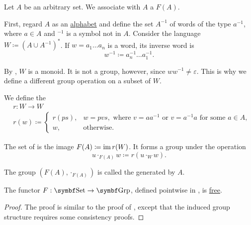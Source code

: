 \begin{definition}\label{def:free_group}
  Let \( A \) be an arbitrary set. We associate with \( A \) a  \( F(A) \).

  First, regard \( A \) as an \hyperref[def:language]{alphabet} and define the set \( A^{-1} \) of words of the type \( a^{-1} \), where \( a \in A \) and \( \mbox{}^{-1} \) is a symbol not in \( A \). Consider the language \( W \coloneqq (A \cup A^{-1})^{*} \). If \( w = a_1 \ldots a_n \) is a word, its inverse word is
  \begin{equation*}
    w^{-1} \coloneqq a_n^{-1} \ldots a_1^{-1}.
  \end{equation*}

  By , \( W \) is a monoid. It is not a group, however, since \( w w^{-1} \neq \varepsilon \). This is why we define a different group operation on a subset of \( W \).

  We define the 
  \begin{align*}
     & r: W \to W                               \\
     & r(w) \coloneqq \begin{cases}
      r(ps), & w = pvs, \text{ where } v = aa^{-1} \text{ or } v = a^{-1}a \text{ for some } a \in A, \\
      w,     & \text{otherwise}.
    \end{cases}
  \end{align*}

  The set of  is the image \( F(A) \coloneqq \operatorname{im} r(W) \). It forms a group under the operation
  \begin{equation*}
    u \cdot_{F(A)} w \coloneqq r(u \cdot_{W} w).
  \end{equation*}

  The group \( (F(A), \cdot_{F(A)}) \) is called the  generated by \( A \).
\end{definition}

\begin{proposition}\label{thm:free_group_is_free_functor}
  The functor \( F: \Cat{Set} \to \Cat{Grp} \), defined pointwise in , is \hyperref[def:free_functor]{free}.
\end{proposition}
\begin{proof}
  The proof is similar to the proof of , except that the induced group structure requires some consistency proofs.
\end{proof}

